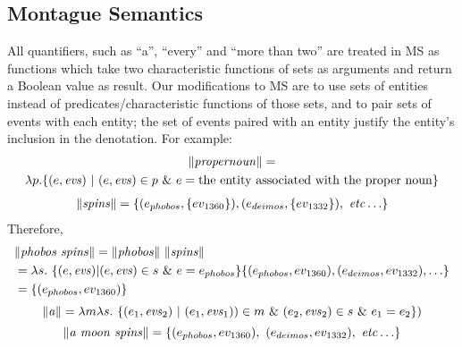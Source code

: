 \documentclass[../main.tex]{subfiles}
\begin{document}
\begin{refsection}
\subsection{Montague Semantics}

All quantifiers, such as ``a'', ``every'' and ``more than two'' are treated in MS as functions which take two characteristic functions of sets as arguments and return a Boolean value as result. Our modifications to MS are to use sets of entities instead of predicates/characteristic functions of those sets, and to pair sets of events with each entity; the set of events paired with an entity justify the entity’s inclusion in the denotation. For example:
\begin{multline*}
	\lVert \mathit{propernoun} \rVert = \\ \lambda p.
	\{(e, \mathit{evs})\ |\ (e, \mathit{evs}) \in p\ \&\ e = \mathrm{the\ entity\ associated\ with\ the\ proper\ noun}\}
\end{multline*}
\begin{equation*}
	\begin{split}
		\lVert \mathit{spins} \rVert = \{(e_{phobos}, \{ev_{\mathrm{1360}}\}),
		(e_{deimos}, \{ev_{\mathrm{1332}}\}),\ \mathit{etc}\ldots\}
	\end{split}
\end{equation*}
Therefore,
\begin{equation*}
	\begin{split}
		& \lVert \mathit{phobos\ spins} \rVert = \lVert \mathit{phobos} \rVert\ \lVert \mathit{spins} \rVert \\
		& = \lambda s.\ \{(e, \mathit{evs}) | (e, \mathit{evs}) \in s\ \&\ e = e_{phobos}\} 
		 \{(e_{phobos},{ev_{\mathrm{1360}}}), (e_{deimos}, ev_{\mathrm{1332}}), \ldots\} \\
		& = \{(e_{phobos}, ev_{\mathrm{1360}})\}
	\end{split}
\end{equation*}
\begin{equation*} %
	\meaningof{a} = \lambda m \lambda s.\ \{(e_1,\evs_2)\ |\ (e_1,\evs_1) )\in m\ 
	\&\ (e_2,\evs_2) \in s\ \&\ e_1 = e_2\})
\end{equation*}
\begin{equation*}
	\lVert \mathit{a\ moon\ spins} \rVert =
	\{(e_{phobos}, ev_{\mathrm{1360}}),\ (e_{deimos}, ev_{\mathrm{1332}}),\ \mathit{etc}\ldots\}
\end{equation*}




\end{refsection}
\end{document}
